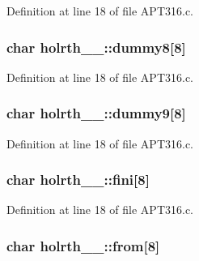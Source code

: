 Definition at line 18 of file A\+P\+T316.\+c.

\subsubsection[{\texorpdfstring{dummy8}{dummy8}}]{\setlength{\rightskip}{0pt plus 5cm}char holrth\+\_\+\_\+\+::dummy8\mbox{[}8\mbox{]}}\hypertarget{structholrth__1___af324df3fbf30ca73f15a32e5ce8cb0d0}{}\label{structholrth__1___af324df3fbf30ca73f15a32e5ce8cb0d0}


Definition at line 18 of file A\+P\+T316.\+c.

\subsubsection[{\texorpdfstring{dummy9}{dummy9}}]{\setlength{\rightskip}{0pt plus 5cm}char holrth\+\_\+\_\+\+::dummy9\mbox{[}8\mbox{]}}\hypertarget{structholrth__1___a3d280f84a091f9b2327020ae093ad024}{}\label{structholrth__1___a3d280f84a091f9b2327020ae093ad024}


Definition at line 18 of file A\+P\+T316.\+c.

\subsubsection[{\texorpdfstring{fini}{fini}}]{\setlength{\rightskip}{0pt plus 5cm}char holrth\+\_\+\_\+\+::fini\mbox{[}8\mbox{]}}\hypertarget{structholrth__1___a426aaf4cb192f5ff20c95a3c053c49ba}{}\label{structholrth__1___a426aaf4cb192f5ff20c95a3c053c49ba}


Definition at line 18 of file A\+P\+T316.\+c.

\subsubsection[{\texorpdfstring{from}{from}}]{\setlength{\rightskip}{0pt plus 5cm}char holrth\+\_\+\_\+\+::from\mbox{[}8\mbox{]}}\hypertarget{structholrth__1___a5a8f1fcb126ae5a08fe83223f3b7e2a0}{}\label{structholrth__1___a5a8f1fcb126ae5a08fe83223f3b7e2a0}


